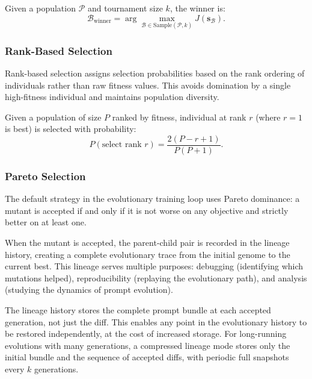 \begin{definition}
Given a population $\mathcal{P}$ and tournament size $k$, the winner is:
\begin{equation}
\mathcal{B}_{\text{winner}} = \arg\max_{\mathcal{B} \in \text{Sample}(\mathcal{P}, k)} J(\mathbf{s}_{\mathcal{B}}).
\end{equation}
\end{definition}

\subsubsection{Rank-Based Selection}

Rank-based selection assigns selection probabilities based on the rank ordering of individuals rather than raw fitness values. This avoids domination by a single high-fitness individual and maintains population diversity.

\begin{definition}
Given a population of size $P$ ranked by fitness, individual at rank $r$ (where $r = 1$ is best) is selected with probability:
\begin{equation}
P(\text{select rank } r) = \frac{2(P - r + 1)}{P(P + 1)}.
\end{equation}
\end{definition}

\subsubsection{Pareto Selection}

The default strategy in the evolutionary training loop uses Pareto dominance: a mutant is accepted if and only if it is not worse on any objective and strictly better on at least one.

When the mutant is accepted, the parent-child pair is recorded in the lineage history, creating a complete evolutionary trace from the initial genome to the current best. This lineage serves multiple purposes: debugging (identifying which mutations helped), reproducibility (replaying the evolutionary path), and analysis (studying the dynamics of prompt evolution).

\begin{implnote}
The lineage history stores the complete prompt bundle at each accepted generation, not just the diff. This enables any point in the evolutionary history to be restored independently, at the cost of increased storage. For long-running evolutions with many generations, a compressed lineage mode stores only the initial bundle and the sequence of accepted diffs, with periodic full snapshots every $k$ generations.
\end{implnote}

